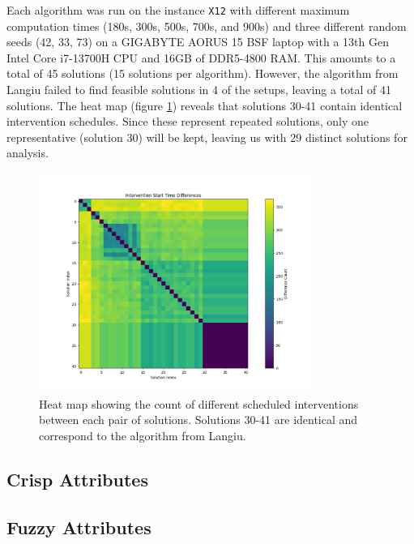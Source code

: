 Each algorithm was run on the instance \texttt{X12} with different maximum computation times (180s, 300s, 500s, 700s, and 900s) and three different random seeds (42, 33, 73) on a GIGABYTE AORUS 15 BSF laptop with a 13th Gen Intel Core i7-13700H CPU and 16GB of DDR5-4800 RAM. This amounts to a total of 45 solutions (15 solutions per algorithm). However, the algorithm from Langiu failed to find feasible solutions in 4 of the setups, leaving a total of 41 solutions. The heat map (figure \ref{fig:dif_sol}) reveals that solutions 30-41 contain identical intervention schedules. Since these represent repeated solutions, only one representative (solution 30) will be kept, leaving us with 29 distinct solutions for analysis.

\begin{figure}[ht]
    \centering
    \includegraphics[width=0.8\textwidth]{ch3/figures/diff_sol.png}
    \caption{Heat map showing the count of different scheduled interventions between each pair of solutions. Solutions 30-41 are identical and correspond to the algorithm from Langiu.}
    \label{fig:dif_sol}
\end{figure}









\subsection{Crisp Attributes}


\subsection{Fuzzy Attributes}

 

